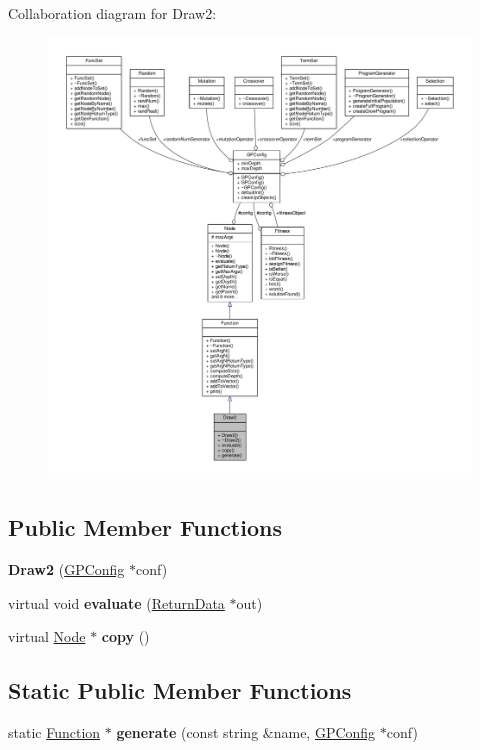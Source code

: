 Collaboration diagram for Draw2\+:
\nopagebreak
\begin{figure}[H]
\begin{center}
\leavevmode
\includegraphics[width=350pt]{classDraw2__coll__graph}
\end{center}
\end{figure}
\subsection*{Public Member Functions}
\begin{DoxyCompactItemize}
\item 
\hypertarget{classDraw2_a60ad134856f332bd4e3134eb3b0cef48}{}\label{classDraw2_a60ad134856f332bd4e3134eb3b0cef48} 
{\bfseries Draw2} (\hyperlink{classGPConfig}{G\+P\+Config} $\ast$conf)
\item 
\hypertarget{classDraw2_affe1fb09b91b328b5f9edf6a8e44995b}{}\label{classDraw2_affe1fb09b91b328b5f9edf6a8e44995b} 
virtual void {\bfseries evaluate} (\hyperlink{classReturnData}{Return\+Data} $\ast$out)
\item 
\hypertarget{classDraw2_af82e7c3c4e46ad383ce3cb4a8589872d}{}\label{classDraw2_af82e7c3c4e46ad383ce3cb4a8589872d} 
virtual \hyperlink{classNode}{Node} $\ast$ {\bfseries copy} ()
\end{DoxyCompactItemize}
\subsection*{Static Public Member Functions}
\begin{DoxyCompactItemize}
\item 
\hypertarget{classDraw2_acc0991ece5e007a9cca5d3f84c4f5bb4}{}\label{classDraw2_acc0991ece5e007a9cca5d3f84c4f5bb4} 
static \hyperlink{classFunction}{Function} $\ast$ {\bfseries generate} (const string \&name, \hyperlink{classGPConfig}{G\+P\+Config} $\ast$conf)
\end{DoxyCompactItemize}
